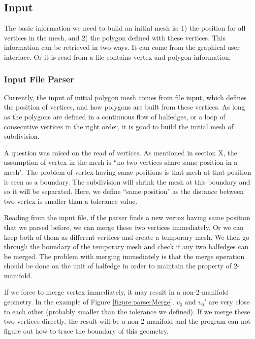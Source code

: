 \documentclass[12pt]{article}
\begin{document}
\subsection{Input}
The basic information we need to build an initial mesh is: 1) the position for all vertices in the mesh, and 2) the polygon defined with these vertices.
This information can be retrieved in two ways. It can come from the graphical user interface. Or it is read from a file contains vertex and polygon information.
\subsubsection{Input File Parser}
Currently, the input of initial polygon mesh comes from file input, which defines the position of vertices, and how polygons are built from these vertices. As long as the polygons are defined in a continuous flow of halfedges, or a loop of consecutive vertices in the right order, it is good to build the initial mesh of subdivision.

A question was raised on the read of vertices. As mentioned in section X, the assumption of vertex in the mesh is ``no two vertices share same position in a mesh". The problem of vertex having same positions is that mesh at that position is seen as a boundary.  The subdivision will shrink the mesh at this boundary and so it will be separated. Here, we define ``same position" as the distance between two vertex is smaller than a tolerance value.

Reading from the input file, if the parser finds a new vertex having same position that we parsed before, we can merge these two vertices immediately. Or we can keep both of them as different vertices and create a temporary mesh. We then go through the boundary of the temporary mesh and check if any two halfedges can be merged. The problem with merging immediately is that the merge operation should be done on the unit of halfedge in order to maintain the property of 2-manifold. 

If we force to merge vertex immediately, it may result in a non-2-manifold geometry. In the example of Figure \ref{figure:parserMerge}, $v_0$ and $v_0'$ are very close to each other (probably smaller than the tolerance we defined). If we merge these two vertices directly, the result will be a non-2-manifold and the program can not figure out how to trace the boundary of this geometry.
\end{document}
